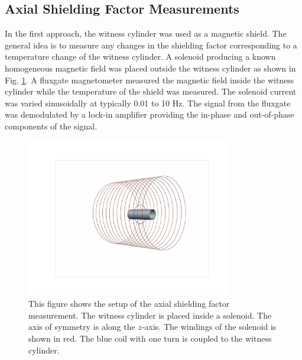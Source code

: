 \documentclass[review]{elsarticle}
\begin{document}
\subsection{Axial Shielding Factor Measurements}
In the first approach, the witness cylinder was used as a magnetic
shield.  The general idea is to measure any changes in the shielding
factor corresponding to a temperature change of the witness cylinder.
A solenoid producing a known homogeneous magnetic field was placed
outside the witness cylinder as shown in Fig. \ref{fig:geometry}.  A
fluxgate magnetometer measured the magnetic field inside the witness
cylinder while the temperature of the shield was measured.  The
solenoid current was varied sinusoidally at typically 0.01 to 10 Hz.
The signal from the fluxgate was demodulated by a lock-in amplifier
providing the in-phase and out-of-phase components of the signal.

\begin{figure}[h!]
\begin{center}
   \includegraphics[width=0.8\textwidth]{geometry.pdf}
    \caption{This figure shows the setup of the axial shielding factor
      measurement. The witness cylinder is placed inside a
      solenoid. The axis of symmetry is along the $z$-axis. The windings
      of the solenoid is shown in red. The blue coil with one turn is
      coupled to the witness cylinder.  }
    \label{fig:geometry}
    \end{center}
\end{figure} 
\end{document}
